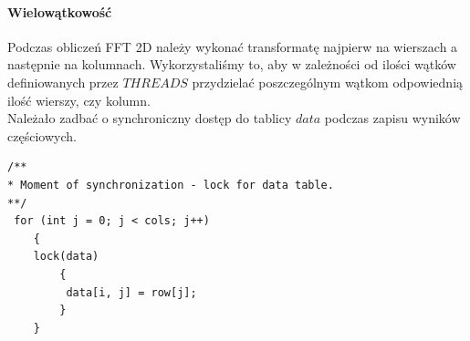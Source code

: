 \paragraph{Wielowątkowość} Podczas obliczeń FFT 2D należy wykonać transformatę najpierw na wierszach a następnie na kolumnach. Wykorzystaliśmy to, aby w zależności od ilości wątków definiowanych przez $THREADS$ przydzielać poszczególnym wątkom odpowiednią ilość wierszy, czy kolumn.\\
Należało zadbać o synchroniczny dostęp do tablicy $data$ podczas zapisu wyników częściowych.\\
\begin{lstlisting}
/**
* Moment of synchronization - lock for data table.
**/
 for (int j = 0; j < cols; j++)
	{
	lock(data)
		{
		 data[i, j] = row[j];
		}
	}
\end{lstlisting}
 
\clearpage\newpage

\clearpage\newpage


